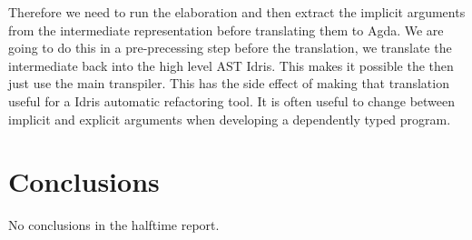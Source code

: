 \documentclass[parskip=half]{scrartcl}
\begin{document}
Therefore we need to run the elaboration and then extract the implicit
arguments from the intermediate representation before translating them to
Agda.  We are going to do this in a pre-precessing step before the translation,
we translate the intermediate back into the high level AST Idris. This makes it
possible the then just use the main transpiler.  This has the side effect of
making that translation useful for a Idris automatic refactoring tool. It is
often useful to change between implicit and explicit arguments when developing
a dependently typed program.







\section{Conclusions}

No conclusions in the halftime report.
\end{document}
